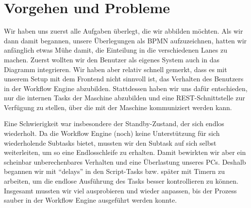 \chapter{Vorgehen und Probleme}\label{ch:vorgehen-und-probleme}

Wir haben uns zuerst alle Aufgaben überlegt, die wir abbilden möchten.
Als wir dann damit begannen, unsere Überlegungen als BPMN aufzuzeichnen, hatten wir anfänglich etwas Mühe damit, die Einteilung in die verschiedenen Lanes zu machen.
Zuerst wollten wir den Benutzer als eigenes System auch in das Diagramm integrieren.
Wir haben aber relativ schnell gemerkt, dass es mit unserem Setup mit dem Frontend nicht sinnvoll ist, das Verhalten des Benutzers in der Workflow Engine abzubilden.
Stattdessen haben wir uns dafür entschieden, nur die internen Tasks der Maschine abzubilden und eine REST-Schnittstelle zur Verfügung zu stellen, über die mit der Maschine kommuniziert werden kann.

Eine Schwierigkeit war insbesondere der Standby-Zustand, der sich endlos wiederholt.
Da die Workflow Engine (noch) keine Unterstützung für sich wiederholende Subtasks bietet, mussten wir den Subtask auf sich selbst weiterleiten, um so eine Endlosschleife zu erhalten.
Damit bewirkten wir aber ein scheinbar unberechenbares Verhalten und eine Überlastung unseres PCs.
Deshalb begannen wir mit ``delays'' in den Script-Tasks bzw. später mit Timern zu arbeiten, um die endlose Ausführung des Tasks besser kontrollieren zu können.
Insgesamt mussten wir viel ausprobieren und wieder anpassen, bis der Prozess sauber in der Workflow Engine ausgeführt werden konnte.